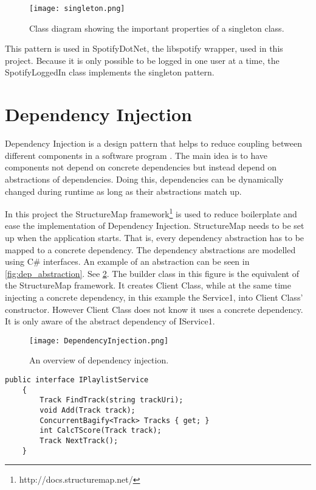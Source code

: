 \begin{figure}
  \centering
  \texttt{[image: singleton.png]}
  \caption{Class diagram showing the important properties of a
    singleton class.}\label{fig:singleton}
\end{figure}

This pattern is used in SpotifyDotNet, the libspotify wrapper, used in
this project. Because it is only possible to be logged in one user at
a time, the SpotifyLoggedIn class implements the singleton pattern.

\section{Dependency Injection}

Dependency Injection is a design pattern that helps to reduce coupling
between different components in a software program \cite{injection}. The main idea is
to have components not depend on concrete dependencies but instead
depend on abstractions of dependencies. Doing this, dependencies can
be dynamically changed during runtime as long as their abstractions
match up.

In this project the StructureMap framework\footnote{http://docs.structuremap.net/} is used to reduce
boilerplate and ease the implementation of Dependency
Injection. StructureMap needs to be set up when the application
starts. That is, every dependency abstraction has to be mapped to a
concrete dependency. The dependency abstractions are modelled using
C\# interfaces. An example of an abstraction can be seen in
\cref{fig:dep_abstraction}. See \cref{fig:dependencyInjection}. The
builder class in this figure is the equivalent of the StructureMap
framework. It creates Client Class, while at the same time injecting a
concrete dependency, in this example the Service1, into Client Class' constructor. However Client
Class does not know it uses a concrete dependency. It is only aware of
the abstract dependency of IService1.

\begin{figure}
  \centering
  \texttt{[image: DependencyInjection.png]}
  \caption{An overview of dependency injection.}\label{fig:dependencyInjection}
\end{figure}

\begin{lstlisting}[caption = {Abstraction of a dependency abstraction
    using C\# interfaces. A concrete dependency has to implement the
    methods described in the abstraction.}, label={fig:dep_abstraction}]
public interface IPlaylistService
    {
        Track FindTrack(string trackUri);
        void Add(Track track);
        ConcurrentBagify<Track> Tracks { get; }
        int CalcTScore(Track track);
        Track NextTrack();
    }
\end{lstlisting}

